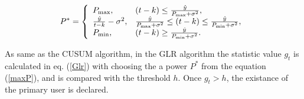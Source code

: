 \begin{equation}
P^{*}=
\left\{
\begin{array}{ll}
P_{{\rm max}}, & (t-k)\leq\frac{\hat{y}}{P_{{\rm max}}+\sigma^2}, \\
\frac{\hat{y}}{t-k}-\sigma^2, & \frac{\hat{y}}{P_{{\rm max}}+\sigma^2}\leq(t-k)\leq\frac{\hat{y}}{P_{{\rm min}}+\sigma^2}, \\
P_{{\rm min}}, & (t-k) \geq \frac{\hat{y}}{P_{{\rm min}}+\sigma^2}.
\end{array}
\right.
\label{maxP}
\end{equation}

As same as the CUSUM algorithm, in the GLR algorithm the statistic value $g_t$ is calculated in eq. (\ref{Glr}) with choosing the a power $P^{*}$ from the equation (\ref{maxP}), and is compared with the threshold $h$. Once $g_t>h$, the existance of the primary user is declared.

    

